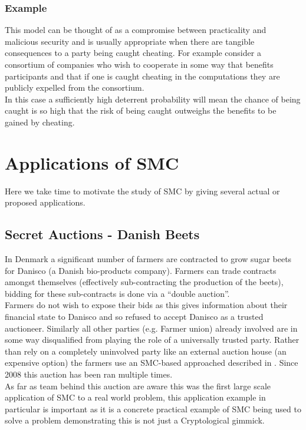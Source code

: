 \documentclass[ %
                    author={Nicholas Tutte},
                supervisor={Prof. Nigel Smart},
                    degree={MEng},
                     title={Secure Two Party Computation},
                  subtitle={A practical comparison of recent protocols},
                      type={Research - GG1K},
                      year={2015} ]{dissertation}
\begin{document}
				\subsubsection{Example} 

					This model can be thought of as a compromise between practicality and malicious security and is usually appropriate when there are tangible consequences to a party being caught cheating. For example consider a consortium of companies who wish to cooperate in some way that benefits participants and that if one is caught cheating in the computations they are publicly expelled from the consortium.\\

					In this case a sufficiently high deterrent probability will mean the chance of being caught is so high that the risk of being caught outweighs the benefits to be gained by cheating.

		\section{Applications of SMC} \label{sub:Applications}
			Here we take time to motivate the study of SMC by giving several actual or proposed applications.

			\subsection{Secret Auctions - Danish Beets} \label{BeetsAuctionApplication}
				In Denmark a significant number of farmers are contracted to grow sugar beets for Danisco (a Danish bio-products company). Farmers can trade contracts amongst themselves (effectively sub-contracting the production of the beets), bidding for these sub-contracts is done via a ``double auction''.\\

				Farmers do not wish to expose their bids as this gives information about their financial state to Danisco and so refused to accept Danisco as a trusted auctioneer. Similarly all other parties (e.g. Farmer union) already involved are in some way disqualified from playing the role of a universally trusted party. Rather than rely on a completely uninvolved party like an external auction house (an expensive option) the farmers use an SMC-based approached described in \cite{SugarBeets}. Since 2008 this auction has been ran multiple times.\\

				As far as team behind this auction are aware this was the first large scale application of SMC to a real world problem, this application example in particular is important as it is a concrete practical example of SMC being used to solve a problem demonstrating this is not just a Cryptological gimmick.
\end{document}
